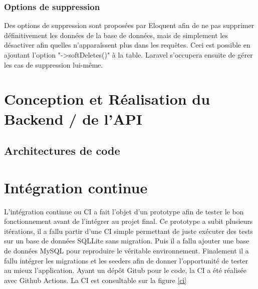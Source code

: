 \documentclass[
    iai, %
    il, %
]{heig-tb}
\begin{document}
\subsection{Options de suppression}
Des options de suppression sont proposées par Eloquent afin de ne pas supprimer définitivement les données de la base de données, mais de simplement les désactiver afin quelles n'apparaîssent plus dans les requêtes.\newline
Ceci est possible en ajoutant l'option "->softDeletes()" à la table.\newline
Laravel s'occupera ensuite de gérer les cas de suppression lui-même.

\chapter{Conception et Réalisation du Backend / de l'API}
\section{Architectures de code}









\chapter{Intégration continue}
L'intégration continue ou CI a fait l'objet d'un prototype afin de tester le bon fonctionnement
avant de l'intégrer au projet final.\newline
Ce prototype a subit plusieurs itérations, il a fallu partir d'une CI simple permettant de juste
exécuter des tests sur un base de données SQLLite sans migration. Puis il a fallu ajouter une base
de données MySQL pour reproduire le véritable environnement. Finalement il a fallu intégrer les
migrations et les seeders afin de donner l'opportunité de tester au mieux l'application.\newline
Ayant un dépôt Gitub pour le code, la CI a été réalisée avec Github Actions.\newline
La CI est consultable sur la figure \ref{ci}
\end{document}
